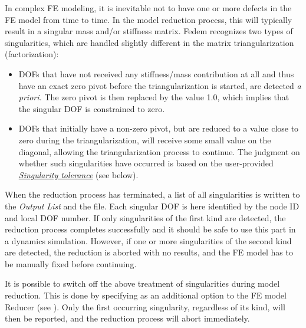 In complex FE modeling, it is inevitable not to have one or more defects in the
FE model from time to time. In the model reduction process, this will typically
result in a singular mass and/or stiffness matrix. Fedem recognizes two types of
singularities, which are handled slightly different in the matrix
triangularization (factorization):

\begin{itemize}
\item
  DOFs that have not received any stiffness/mass contribution at all and
  thus have an exact zero pivot before the triangularization is started,
  are detected {\sl a priori.} The zero pivot is then replaced by the value 1.0,
  which implies that the singular DOF is constrained to zero.
\item
  DOFs that initially have a non-zero pivot, but are reduced to a value
  close to zero during the triangularization, will receive some small
  value on the diagonal, allowing the triangularization process to continue.
  The judgment on whether such singularities have occurred is based on
  the user-provided \protect\hyperlink{singularity-tolerance}
  {\sl Singularity tolerance} (see below).
\end{itemize}

When the reduction process has terminated, a list of all singularities
is written to the {\sl Output List} and the  file.
Each singular DOF is here identified by the node ID and local DOF number.
If only singularities of the first kind are detected, the reduction process
completes successfully and it should be safe to use this part in a dynamics
simulation. However, if one or more singularities of the second kind are
detected, the reduction is aborted with no results, and the FE model has to be
manually fixed before continuing.


It is possible to switch off the above treatment of singularities during
model reduction. This is done by specifying 
as an additional option to the FE model Reducer (see
).
Only the first occurring singularity, regardless of its kind,
will then be reported, and the reduction process will abort immediately.

